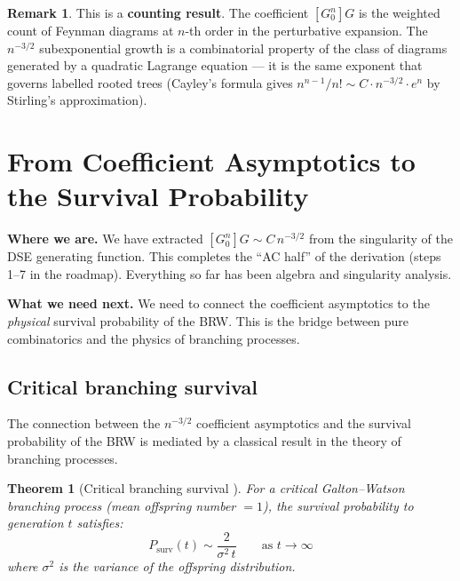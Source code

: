 \documentclass[11pt,a4paper]{article}
\newtheorem{theorem}{Theorem}[section]
\theoremstyle{definition}
\newtheorem*{remark}{Remark}
\newcommand{\Psurv}{P_{\mathrm{surv}}}
\begin{document}
\begin{remark}
This is a \textbf{counting result}. The coefficient $[G_0^n]G$ is the
weighted count of Feynman diagrams at $n$-th order in the perturbative
expansion. The $n^{-3/2}$ subexponential growth is a combinatorial
property of the class of diagrams generated by a quadratic Lagrange
equation --- it is the same exponent that governs labelled rooted trees
(Cayley's formula gives $n^{n-1}/n! \sim C \cdot n^{-3/2} \cdot e^n$
by Stirling's approximation).
\end{remark}

\section{From Coefficient Asymptotics to the Survival Probability}
\label{sec:survival}

\noindent\textbf{Where we are.} We have extracted $[G_0^n]G \sim C\, n^{-3/2}$
from the singularity of the DSE generating function. This completes the
``AC half'' of the derivation (steps 1--7 in the roadmap). Everything so
far has been algebra and singularity analysis.

\noindent\textbf{What we need next.} We need to connect the coefficient
asymptotics to the \emph{physical} survival probability of the BRW. This
is the bridge between pure combinatorics and the physics of branching
processes.

\subsection{Critical branching survival}

The connection between the $n^{-3/2}$ coefficient asymptotics and the
survival probability of the BRW is mediated by a classical result in
the theory of branching processes.

\begin{theorem}[Critical branching survival {\cite{kolmogorov1938,athreyney1972}}]
\label{thm:brw_survival}
For a critical Galton--Watson branching process (mean offspring number $= 1$),
the survival probability to generation $t$ satisfies:
\begin{equation}
\boxed{\Psurv(t) \sim \frac{2}{\sigma^2\, t} \qquad \text{as } t \to \infty}
\label{eq:surv_brw}
\end{equation}
where $\sigma^2$ is the variance of the offspring distribution.
\end{theorem}
\end{document}
